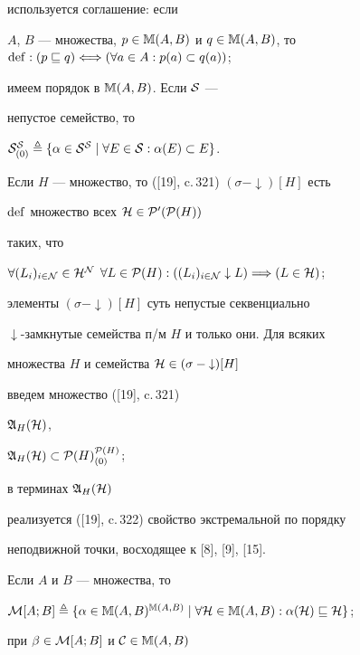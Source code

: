используется соглашение: если


$A$, $B$ --- множества, $p \in {\Bbb M}(A,B)$ и $q \in


{\Bbb M}(A,B)$, то $\Def:


(p \sqsubseteq q) \Longleftrightarrow (\fo{a} \in A:


{p(a)} \subset {q(a)})$;


имеем порядок в ${\Bbb M}(A,B)$. Если ${\cal S}$ ---


непустое семейство, то


${{\cal S}^{\cal S}_{(0)}} \stac \{\alpha \in {\cal S}^{\cal S} \mid


\fo{E} \in {\cal S}:{{\alpha}(E)} \subset E\}$.


Если $H$ --- множество, то ([19], c.\,321) $(\sigma -{\downarrow})[H]$ есть


$\operatorname{def}$ множество всех ${\cal H} \in {{\cal P}'({\cal P}(H))}$


таких, что


$\fo{(L_i)_{i \in {\cal N}}} \in {{\cal H}^{\cal N}}$ $\fo{L} \in


{{\cal P}(H)}:


({(L_i)_{i \in {\cal N}}} \downarrow L) \Lo (L \in {\cal H})$;


элементы $(\sigma - {\downarrow})[H]$ суть непустые секвенциально


$\downarrow$-замкнутые семейства п/м $H$ и только они. Для всяких


множества $H$ и семейства ${\cal H} \in (\sigma - {\downarrow})[H]$


введем множество ([19], c.\,321)


${{\frak A}_H}({\cal H})$,


${{\frak A}_H}({\cal H}) \subset {{\cal P}(H)}^{{\cal P}(H)}_{(0)}$;


в терминах ${{\frak A}_H}({\cal H})$


реализуется ([19], c.\,322) свойство экстремальной по порядку


неподвижной точки, восходящее к [8], [9], [15].


Если $A$ и $B$ --- множества, то


${\cal M}[A;B] \stac \{\alpha \in {\Bbb M}(A,B)^{{\Bbb M}(A,B)} \mid


\fo{\cal H} \in {\Bbb M}(A,B):{{\alpha}({\cal H})} \sqsubseteq


{\cal H}\}$;


при $\beta \in {\cal M}[A;B]$ и ${\cal C} \in {\Bbb M}(A,B)$


